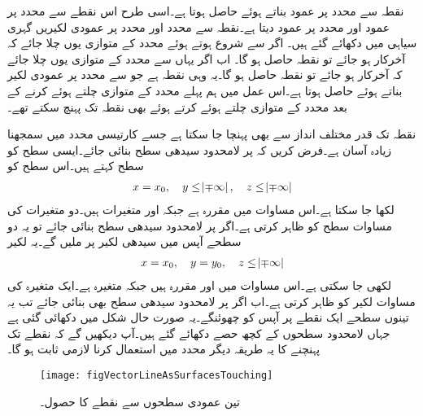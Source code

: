  نقطہ  سے  محدد پر عمود بناتے ہوئے   حاصل ہوتا ہے۔اسی طرح اس نقطے سے  محدد پر عمود  اور  محدد پر عمود  دیتا ہے۔نقطہ  سے  محدد اور  محدد پر عمودی لکیریں گہری سیاہی میں دکھائے گئے ہیں۔ اگر  سے  شروع ہوتے ہوئے  محدد کے متوازی یوں چلا جائے کہ آخرکار  ہو جائے تو نقطہ  حاصل ہو گا۔ اب اگر یہاں سے  محدد کے متوازی یوں چلا جائے کہ آخرکار  ہو جائے تو نقطہ  حاصل ہو گا۔یہ وہی نقطہ ہے جو  سے  محدد پر عمودی لکیر بناتے ہوئے حاصل ہوتا ہے۔اس عمل میں ہم پہلے  محدد کے متوازی چلتے ہوئے  کرنے کے بعد  محدد کے متوازی چلتے ہوئے  کرتے ہوئے بھی نقطہ  تک پہنچ سکتے تھے۔

نقطہ  تک قدر مختلف انداز سے بھی پہنچا جا سکتا ہے جسے کارتیسی محدد میں سمجھنا زیادہ آسان ہے۔فرض کریں کہ  پر لامحدود  سیدھی سطح بنائی جائے۔ایسی سطح کو  سطح  کہتے ہیں۔اس سطح کو
\begin{align*}
x=x_0, \quad  y\le \abs{\mp \infty}, \quad z \le \abs{\mp \infty}
\end{align*} 
لکھا جا سکتا ہے۔اس مساوات میں  مقررہ ہے جبکہ  اور  متغیرات ہیں۔دو متغیرات کی مساوات سطح کو ظاہر کرتی ہے۔اگر  پر لامحدود  سیدھی سطح بنائی جائے تو یہ دو سطحے  آپس میں سیدھی لکیر پر ملیں گے۔یہ لکیر
\begin{align*}
x=x_0, \quad  y=y_0, \quad z \le \abs{\mp \infty}
\end{align*} 
لکھی جا سکتی ہے۔اس مساوات میں  اور  مقررہ ہیں جبکہ  متغیرہ ہے۔ایک متغیرہ کی مساوات لکیر کو ظاہر کرتی ہے۔اب اگر  پر لامحدود  سیدھی سطح بھی بنائی جائے تب یہ تینوں سطحے ایک نقطے  پر آپس کو چھوئنگے۔یہ صورت حال شکل  میں دکھائی گئی ہے جہاں لامحدود سطحوں کے کچھ حصے دکھائے گئے ہیں۔آپ دیکھیں گے کہ نقطے تک پہنچنے کا یہ طریقہ دیگر محدد میں استعمال کرنا لازمی ثابت ہو گا۔
\begin{figure}
\centering
\texttt{[image: figVectorLineAsSurfacesTouching]}
\caption{تین عمودی سطحوں سے نقطے کا حصول۔}
\label{شکل_سمتیہ_تین_عمودی_سطحوں_سے_نقطہ}
\end{figure}

